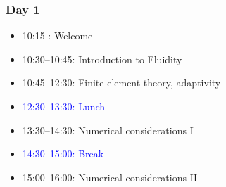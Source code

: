 
\begin{frame}
  \frametitle{Day 1}
  \begin{itemize}[]
  \item[] 10:15      : Welcome
  \item[] 10:30--10:45: Introduction to Fluidity
  \item[] 10:45--12:30: Finite element theory, adaptivity
  \item[] \textcolor{blue}{12:30--13:30: Lunch}
  \item[] 13:30--14:30: Numerical considerations I
  \item[] \textcolor{blue}{14:30--15:00: Break}
  \item[] 15:00--16:00: Numerical considerations II
  \end{itemize}
\end{frame}
